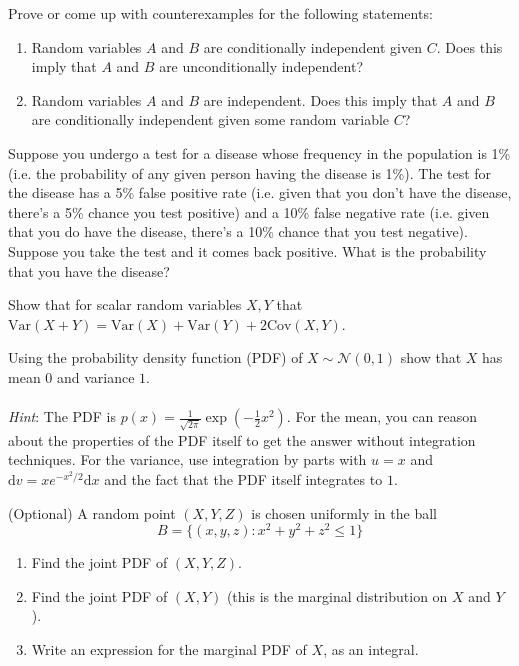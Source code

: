 \documentclass{harvardml}
\theoremstyle{definition}
\theoremstyle{plain}
\newcommand{\var}{\text{Var}}
\newcommand{\cov}{\text{Cov}}
\begin{document}
		    
\begin{problem}
    Prove or come up with counterexamples for the following statements:
    \begin{enumerate}[label=(\alph*)]
        \item  Random variables $A$ and $B$ are conditionally independent given $C$.  Does this imply that $A$ and $B$ are unconditionally independent?
        \item  Random variables $A$ and $B$ are independent.  Does this imply that $A$ and $B$ are conditionally independent given some random variable $C$?
    \end{enumerate}

\end{problem}
\begin{problem}
    Suppose you undergo a test for a disease whose frequency in the population is 1\% (i.e. the probability of any given person having the disease is 1\%). The test for the disease has a 5\% false positive rate (i.e. given that you don't have the disease, there's a 5\% chance you test positive) and a 10\% false negative rate (i.e. given that you do have the disease, there's a 10\% chance that you test negative). \\
    
    \noindent Suppose you take the test and it comes back positive. What is the probability that you have the disease? 
\end{problem}

\begin{problem}
    Show that for scalar random variables $X, Y$ that $\var(X+Y) = \var(X) + \var(Y) + 2\cov(X, Y)$.
    \end{problem}
    
\begin{problem}

Using the probability density function (PDF) of $X \sim \mathcal{N}(0, 1)$ show that $X$ has mean $0$ and variance $1$. \\
\\
\emph{Hint}: The PDF is $p(x) = \frac{1}{\sqrt{2\pi}} 
				\exp\left( -\frac{1}{2} x^2 \right).$ For the mean, you can reason about the properties of the PDF itself to get the answer without integration techniques. For the variance, use integration by parts with $u=x$ and $\mathrm{d}v = xe^{-x^2/2} \mathrm{d}x$ and the fact that the PDF itself integrates to $1$.
\end{problem}

\begin{problem}

(Optional) A random point $(X, Y, Z)$ is chosen uniformly in the ball 
$$B = \{(x, y, z): x^2 + y^2 + z^2 \leq 1\}$$

\begin{enumerate} [label=(\alph*)] 
\item Find the joint PDF of $(X, Y, Z)$.
\item Find the joint PDF of  $(X, Y)$ (this is the marginal distribution on $X$ and $Y$).
\item Write an expression for the marginal PDF of $X$, as an integral.

\end{enumerate}
\end{problem}
\end{document}
